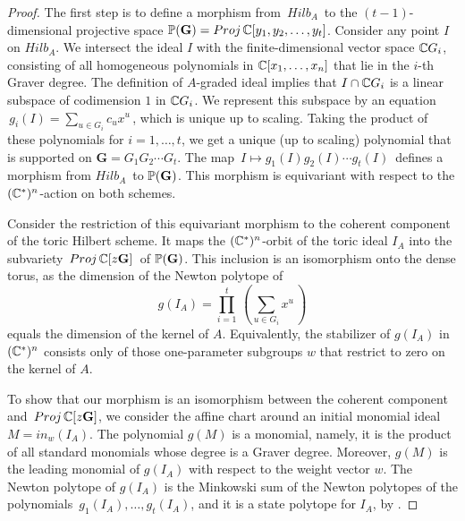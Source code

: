 \begin{proof} The first
step is to define a morphism from $\,Hilb_A \,$ to
the $(t-1)$-dimensional projective space
$\P({\mathbf G}) = Proj \, \k[y_1,y_2,\ldots,y_t]$.
Consider any point $I$ on $Hilb_A$. We intersect
the ideal $I$ with the finite-dimensional vector space
$\k G_i$, consisting of all homogeneous polynomials
in $\k[x_1,\ldots,x_n]$ that lie in the $i$-th  Graver degree.
The definition of $A$-graded ideal implies that
$I \cap \k G_i$ is a linear subspace of codimension $1$ in $\k G_i$.
We represent this subspace by an equation
$\, g_i(I) = \sum_{u \in G_i } c_u x^u \,$, which is 
unique up to scaling. Taking the product of these
polynomials for $i=1,\ldots,t$, we get a unique (up to scaling)
polynomial that is supported on ${\mathbf G} = G_1 G_2 \cdots G_t$.
The map $\, I \mapsto g_1(I) g_2(I) \cdots g_t(I)\,$
defines a morphism from $Hilb_A \,$ to $\P({\mathbf G})$.
This morphism is equivariant with respect to the  $(\k^*)^n$-action
on both schemes.

Consider the restriction of this equivariant
 morphism to the coherent component of the toric Hilbert scheme.
It maps the $(\k^*)^n$-orbit of the toric ideal $I_A$
into the subvariety $\,Proj \,\k[z {\mathbf G}]\,$
of $\P({\mathbf G})$. This inclusion
is an isomorphism onto the dense torus, 
as the dimension of the Newton polytope of 
$$ g(I_A) = \prod_{i=1}^t \,(\sum_{u \in G_i }  x^u \,) $$
equals the dimension of the kernel of $A$. Equivalently,
the stabilizer of $g(I_A)$ in $(\k^*)^n$ 
consists only of those one-parameter subgroups
$w$ that restrict to zero on the kernel of $A$.

To show that our morphism is an isomorphism between the coherent component
and  $\,Proj \,\k[z {\mathbf G}]$,
we consider the affine chart around an initial monomial ideal
$M = in_w(I_A)$. The polynomial $g(M)$ is a monomial,
namely, it is the product of all standard monomials whose
degree is a  Graver degree. Moreover, $g(M)$ is the leading monomial
of $g(I_A)$ with respect to the weight vector $w$. The Newton
polytope of $g(I_A)$ is the Minkowski sum of the Newton polytopes 
of the polynomials $\,g_1(I_A),   \ldots, g_t(I_A)$,
and it is a state polytope for $I_A$, by \cite[Theorem 7.5]{HS:St2}.


\end{proof}
